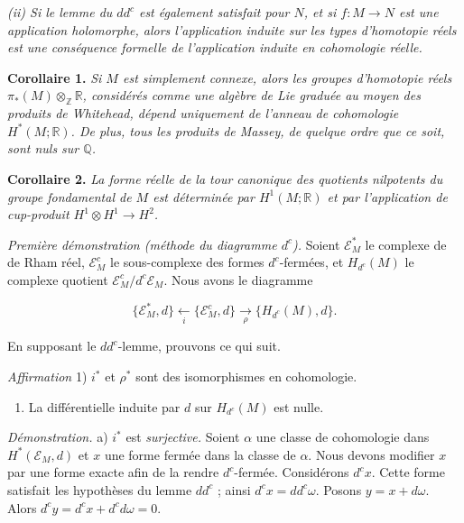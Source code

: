 \documentclass[
  french,
  a3paper,
  a3paper]{extarticle}
\providecommand{\tightlist}{%
  \setlength{\itemsep}{0pt}\setlength{\parskip}{0pt}}
\begin{document}
\emph{(ii) Si le lemme du \(dd^c\) est également satisfait pour \(N\),
et si \(f:M\longrightarrow N\) est une application holomorphe, alors
l'application induite sur les types d'homotopie réels est une
conséquence formelle de l'application induite en cohomologie réelle.}

\textbf{Corollaire 1.} \emph{Si \(M\) est simplement connexe, alors les
groupes d'homotopie réels \(\pi_*(M)\otimes_{\mathbb Z}\mathbb R\),
considérés comme une algèbre de Lie graduée au moyen des produits de
Whitehead, dépend uniquement de l'anneau de cohomologie
\(H^*(M;\mathbb R)\). De plus, tous les produits de Massey, de quelque
ordre que ce soit, sont nuls sur \(\mathbb Q\).}

\textbf{Corollaire 2.} \emph{La forme réelle de la tour canonique des
quotients nilpotents du groupe fondamental de \(M\) est déterminée par
\(H^1(M;\mathbb R)\) et par l'application de cup-produit
\(H^1\otimes H^1\longrightarrow H^2\).}

\emph{Première démonstration (méthode du diagramme \(d^c\)).} Soient
\(\mathscr E_M^*\) le complexe de de Rham réel, \(\mathscr E_M^c\) le
sous-complexe des formes \(d^c\)-fermées, et \(H_{d^c}(M)\) le complexe
quotient \(\mathscr E_M^c/d^c\mathscr E_M\). Nous avons le diagramme

\[\{\mathscr E_M^*,d\}\underset{i}{\longleftarrow}\{\mathscr E_M^c,d\}\underset{\rho}{\longrightarrow}\{H_{d^c}(M),d\}.\]

En supposant le \(dd^c\)-lemme, prouvons ce qui suit.

\emph{Affirmation} 1) \(i^*\) et \(\rho^*\) sont des isomorphismes en
cohomologie.

\begin{enumerate}
\def\labelenumi{\arabic{enumi})}
\setcounter{enumi}{1}
\tightlist
\item
  La différentielle induite par \(d\) sur \(H_{d^c}(M)\) est nulle.
\end{enumerate}

\emph{Démonstration.} a) \(i^*\) est \emph{surjective.} Soient
\(\alpha\) une classe de cohomologie dans \(H^*(\mathscr E_M,d)\) et
\(x\) une forme fermée dans la classe de \(\alpha\). Nous devons
modifier \(x\) par une forme exacte afin de la rendre \(d^c\)-fermée.
Considérons \(d^cx\). Cette forme satisfait les hypothèses du lemme
\(dd^c\) ; ainsi \(d^cx=dd^c\omega\). Posons \(y=x+d\omega\). Alors
\(d^cy=d^cx+d^cd\omega=0\).
\end{document}
